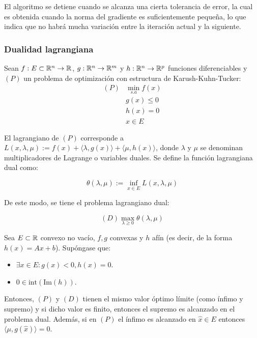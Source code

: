 El algoritmo se detiene cuando se alcanza una cierta tolerancia de error, la cual es obtenida cuando la norma del gradiente es suficientemente pequeña, lo que indica que no habrá mucha variación entre la iteración actual y la siguiente.

\subsubsection{Dualidad lagrangiana}

Sean $f:E\subset\mathbb{R}^n\to\mathbb{R}$, $g:\mathbb{R}^n \to \mathbb{R}^m$ y $h:\mathbb{R}^n \to \mathbb{R}^p$ funciones diferenciables y $(P)$ un problema de optimización con estructura de Karush-Kuhn-Tucker:
\begin{equation}
	\begin{aligned}
		(P) & \min_{s.a} f(x)\\
		& g(x) \leq 0\\
		& h(x) = 0\\
		& x\in E
	\end{aligned}
\end{equation}
	

El lagrangiano de $(P)$ corresponde a $L(x,\lambda,\mu) := f(x) + \langle\lambda,g(x)\rangle + \langle\mu,h(x)\rangle$, donde $\lambda$ y $\mu$ se denominan multiplicadores de Lagrange o variables duales. Se define la función lagrangiana dual como:

\begin{equation}
	\theta(\lambda,\mu):=\inf_{x\in E} L(x,\lambda,\mu)
\end{equation} 

De este modo, se tiene el problema lagrangiano dual:

\begin{equation}
	(D) \max_{\lambda\geq 0} \theta(\lambda,\mu)
\end{equation}

\begin{theorem}
	Sea $E\subset\mathbb{R}$ convexo no vacío, $f,g$ convexas y $h$ afín (es decir, de la forma $h(x) = Ax+b$). Supóngase que:

\begin{itemize}
	\item $\exists x\in E:g(x)<0, h(x)=0$.
	\item $0\in \text{int}(\text{Im}(h))$.
\end{itemize}

Entonces, $(P)$ y $(D)$ tienen el mismo valor óptimo límite (como ínfimo y supremo) y si dicho valor es finito, entonces el supremo es alcanzado en el problema dual. Además, si en $(P)$ el ínfimo es alcanzado en $\hat{x}\in E$ entonces $\langle \mu,g(\hat{x})\rangle=0$.
\end{theorem}
	
